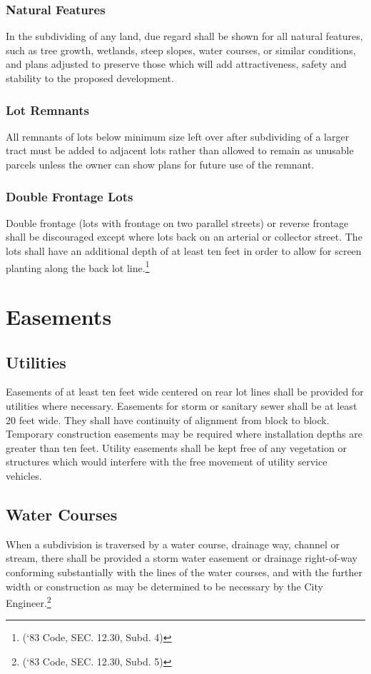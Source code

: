 \subsubsection{Natural Features}
In the subdividing of any land, due regard shall be shown for all natural features, such as tree growth, wetlands, steep slopes, water courses, or similar conditions, and plans adjusted to preserve those which will add attractiveness, safety and stability to the proposed development.
\subsubsection{Lot Remnants}
All remnants of lots below minimum size left over after subdividing of a larger tract must be added to adjacent lots rather than allowed to remain as unusable parcels unless the owner can show plans for future use of the remnant.
\subsubsection{Double Frontage Lots}
Double frontage (lots with frontage on two parallel streets) or reverse frontage shall be discouraged except where lots back on an arterial or collector street.  The lots shall have an additional depth of at least ten feet in order to allow for screen planting along the back lot line.\footnote{(‘83 Code, SEC. 12.30, Subd. 4)}

\section{Easements}
\subsection{Utilities}
Easements of at least ten feet wide centered on rear lot lines shall be provided for utilities where necessary. Easements for storm or sanitary sewer shall be at least 20 feet wide. They shall have continuity of alignment from block to block. Temporary construction easements may be required where installation depths are greater than ten feet. Utility easements shall be kept free of any vegetation or structures which would interfere with the free movement of utility service vehicles.
\subsection{Water Courses}
When a subdivision is traversed by a water course, drainage way, channel or stream, there shall be provided a storm water easement or drainage right-of-way conforming substantially with the lines of the water courses, and with the further width or construction as may be determined to be necessary by the City Engineer.\footnote{(‘83 Code, SEC. 12.30, Subd. 5)}
